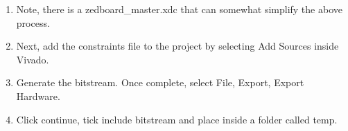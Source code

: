 \begin{enumerate}
            \begin{lstlisting}[style=xdc]
                set_property -dict {PACKAGE_PIN T22 IOSTANDARD LVCMOS33} [get_ports {o_leds[0]}];
                set_property -dict {PACKAGE_PIN T21 IOSTANDARD LVCMOS33} [get_ports {o_leds[1]}];
                set_property -dict {PACKAGE_PIN U22 IOSTANDARD LVCMOS33} [get_ports {o_leds[2]}];
                set_property -dict {PACKAGE_PIN U21 IOSTANDARD LVCMOS33} [get_ports {o_leds[3]}];
                set_property -dict {PACKAGE_PIN V22 IOSTANDARD LVCMOS33} [get_ports {o_leds[4]}];
                set_property -dict {PACKAGE_PIN W22 IOSTANDARD LVCMOS33} [get_ports {o_leds[5]}];
                set_property -dict {PACKAGE_PIN U19 IOSTANDARD LVCMOS33} [get_ports {o_leds[6]}];
                set_property -dict {PACKAGE_PIN U14 IOSTANDARD LVCMOS33} [get_ports {o_leds[7]}];
            \end{lstlisting}

        \item Note, there is a zedboard\_master.xdc that can somewhat simplify the above process. 
        \item Next, add the constraints file to the project by selecting Add Sources inside Vivado. 
        \item Generate the bitstream. Once complete, select File, Export, Export Hardware.
        \item Click continue, tick include bitstream and place inside a folder called temp.      
    \end{enumerate} 